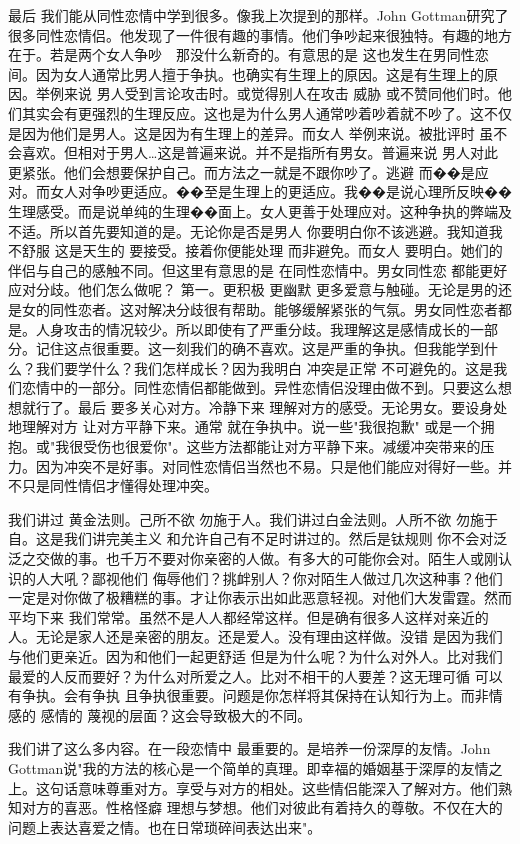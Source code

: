 最后 我们能从同性恋情中学到很多。像我上次提到的那样。John Gottman研究了很多同性恋情侣。他发现了一件很有趣的事情。他们争吵起来很独特。有趣的地方在于。若是两个女人争吵　那没什么新奇的。有意思的是 这也发生在男同性恋间。因为女人通常比男人擅于争执。也确实有生理上的原因。这是有生理上的原因。举例来说 男人受到言论攻击时。或觉得别人在攻击 威胁 或不赞同他们时。他们其实会有更强烈的生理反应。这也是为什么男人通常吵着吵着就不吵了。这不仅是因为他们是男人。这是因为有生理上的差异。而女人 举例来说。被批评时 虽不会喜欢。但相对于男人…这是普遍来说。并不是指所有男女。普遍来说 男人对此更紧张。他们会想要保护自己。而方法之一就是不跟你吵了。逃避 而��是应对。而女人对争吵更适应。��至是生理上的更适应。我��是说心理所反映��生理感受。而是说单纯的生理��面上。女人更善于处理应对。这种争执的弊端及不适。所以首先要知道的是。无论你是否是男人 你要明白你不该逃避。我知道我不舒服 这是天生的 要接受。接着你便能处理 而非避免。而女人 要明白。她们的伴侣与自己的感触不同。但这里有意思的是 在同性恋情中。男女同性恋 都能更好应对分歧。他们怎么做呢？ 第一。更积极 更幽默 更多爱意与触碰。无论是男的还是女的同性恋者。这对解决分歧很有帮助。能够缓解紧张的气氛。男女同性恋者都是。人身攻击的情况较少。所以即使有了严重分歧。我理解这是感情成长的一部分。记住这点很重要。这一刻我们的确不喜欢。这是严重的争执。但我能学到什么？我们要学什么？我们怎样成长？因为我明白 冲突是正常 不可避免的。这是我们恋情中的一部分。同性恋情侣都能做到。异性恋情侣没理由做不到。只要这么想想就行了。最后 要多关心对方。冷静下来 理解对方的感受。无论男女。要设身处地理解对方 让对方平静下来。通常 就在争执中。说一些"我很抱歉" 或是一个拥抱。或"我很受伤也很爱你"。这些方法都能让对方平静下来。减缓冲突带来的压力。因为冲突不是好事。对同性恋情侣当然也不易。只是他们能应对得好一些。并不只是同性情侣才懂得处理冲突。 

我们讲过 黄金法则。己所不欲 勿施于人。我们讲过白金法则。人所不欲 勿施于自。这是我们讲完美主义 和允许自己有不足时讲过的。然后是钛规则 你不会对泛泛之交做的事。也千万不要对你亲密的人做。有多大的可能你会对。陌生人或刚认识的人大吼？鄙视他们 侮辱他们？挑衅别人？你对陌生人做过几次这种事？他们一定是对你做了极糟糕的事。才让你表示出如此恶意轻视。对他们大发雷霆。然而平均下来 我们常常。虽然不是人人都经常这样。但是确有很多人这样对亲近的人。无论是家人还是亲密的朋友。还是爱人。没有理由这样做。没错 是因为我们与他们更亲近。因为和他们一起更舒适 但是为什么呢？为什么对外人。比对我们最爱的人反而要好？为什么对所爱之人。比对不相干的人要差？这无理可循 可以有争执。会有争执 且争执很重要。问题是你怎样将其保持在认知行为上。而非情感的 感情的 蔑视的层面？这会导致极大的不同。 

我们讲了这么多内容。在一段恋情中 最重要的。是培养一份深厚的友情。John Gottman说"我的方法的核心是一个简单的真理。即幸福的婚姻基于深厚的友情之上。这句话意味尊重对方。享受与对方的相处。这些情侣能深入了解对方。他们熟知对方的喜恶。性格怪癖 理想与梦想。他们对彼此有着持久的尊敬。不仅在大的问题上表达喜爱之情。也在日常琐碎间表达出来"。 

